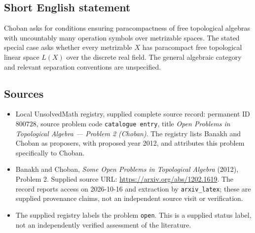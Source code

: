 \documentclass[11pt]{article}
\begin{document}
\subsection{Short English statement}
Choban asks for conditions ensuring paracompactness of free topological algebras with uncountably many operation symbols over metrizable spaces. The stated special case asks whether every metrizable \(X\) has paracompact free topological linear space \(L(X)\) over the discrete real field. The general algebraic category and relevant separation conventions are unspecified.
\subsection{Sources}
\begin{itemize}
\item Local UnsolvedMath registry, supplied complete source record: permanent ID \(800728\), source problem code \texttt{catalogue entry}, title \emph{Open Problems in Topological Algebra --- Problem 2 (Choban)}. The registry lists Banakh and Choban as proposers, with proposed year 2012, and attributes this problem specifically to Choban.
\item Banakh and Choban, \emph{Some Open Problems in Topological Algebra} (2012), Problem 2. Supplied source URL: \url{https://arxiv.org/abs/1202.1619}. The record reports access on 2026-10-16 and extraction by \texttt{arxiv\_latex}; these are supplied provenance claims, not an independent source visit or verification.
\item The supplied registry labels the problem \texttt{open}. This is a supplied status label, not an independently verified assessment of the literature.
\end{itemize}
\end{document}
